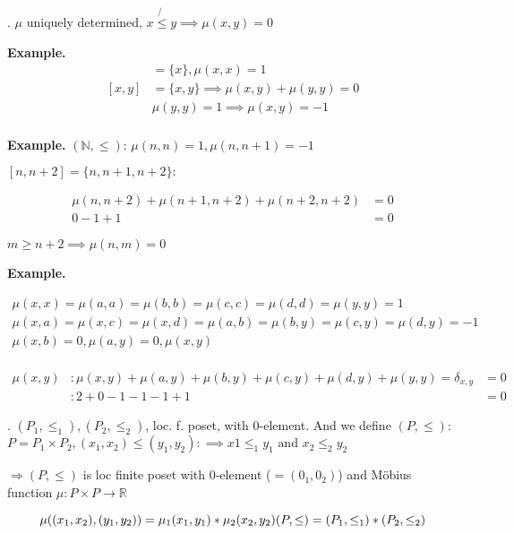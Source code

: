 \Remark.
$\mu$ uniquely determined, $x \not{\leq} y \implies \mu(x,y) = 0$

\textbf{Example.}
\begin{align*}
  [x,x] & = \{x\}, \mu(x,x) = 1 \\
  [x,y] &= \{x,y\} \implies \mu(x,y) + \mu(y,y) = 0 \\
        &           \mu(y,y) = 1 \implies \mu(x,y) = -1 \\
\end{align*}

\textbf{Example.}
$(\mathbb{N}, \leq)$: $\mu(n,n) = 1, \mu(n,n+1) = -1$

$[n,n+2] = \{n,n+1, n+2\}:$

\begin{align*}
    \mu(n,n+2) + \mu(n+1,n+2) + \mu(n+2, n+2) &= 0 \\
    0 -1 +1 &= 0
\end{align*}

$ m \geq n+2 \implies \mu(n,m) = 0$

\textbf{Example.}

\begin{gather*}
    \mu(x,x) = \mu(a,a) = \mu(b,b) = \mu(c,c) = \mu(d,d) = \mu(y,y) = 1\\
    \mu(x,a) = \mu(x,c) = \mu(x,d) = \mu(a,b) = \mu(b,y) = \mu(c,y) = \mu(d,y) = -1\\
    \mu(x,b) = 0, \mu(a,y) = 0, \mu(x,y) \\
\end{gather*}

\begin{align*}
    \mu(x,y)&: \mu(x,y) + \mu(a,y) + \mu(b,y) + \mu(c,y) + \mu(d,y) + \mu(y,y) = \delta_{x,y} &= 0 \\
        &: 2 +0 -1 -1 -1 +1 &= 0
\end{align*}


\Theorem.
$(P_1, \leq_1), (P_2, \leq_2)$, loc. f. poset, with 0-element. 
And we define $(P, \leq):$ $P = P_1 \times P_2, (x_1,x_2) \leq (y_1, y_2) :\implies x1 \leq_1 y_1 \text{ and } x_2 \leq_2 y_2$

$\Rightarrow (P, \leq)$ is loc finite poset with 0-element ($=(0_1, 0_2)$) and Möbius function $\mu: P\times P \rightarrow \mathbb{R}$

\[
    \mu ( (x_1, x_2), (y_1,y_2)) = \mu_1(x_1,y_1) * \mu_2(x_2,y_2) \\
    (P, \leq) = (P_1, \leq_1) * (P_2, \leq_2)
\]

